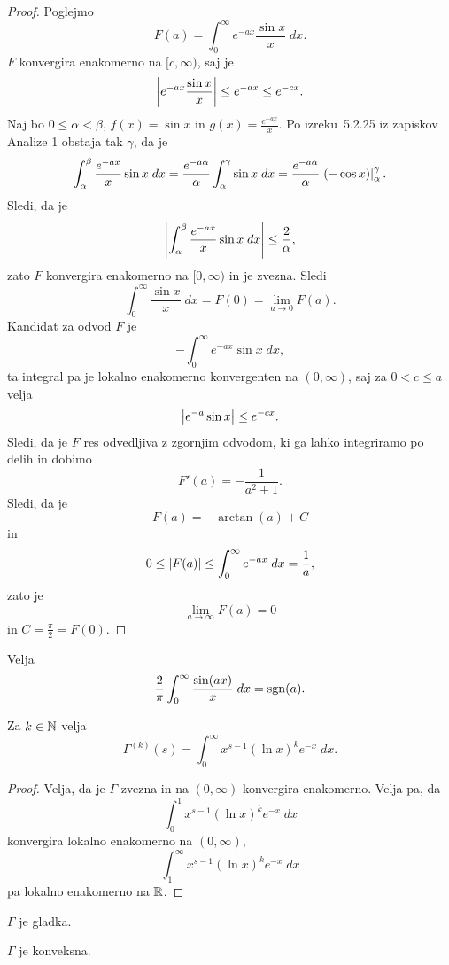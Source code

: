 \begin{proof}
Poglejmo
\[
F(a) = \int_0^\infty e^{-ax} \frac{\sin x}{x}\;dx.
\]
$F$ konvergira enakomerno na $[c,\infty)$, saj je
\[
\left\lvert e^{-ax} \frac{\sin x}{x}\right\rvert \leq e^{-ax} \leq e^{-cx}.
\]
Naj bo $0 \leq \alpha < \beta$, $f(x) = \sin x$ in
$g(x) = \frac{e^{-ax}}{x}$. Po izreku~5.2.25 iz zapiskov Analize 1
obstaja tak $\gamma$, da je
\[
\int_\alpha^\beta \frac{e^{-ax}}{x} \sin x\;dx =
\frac{e^{-a\alpha}}{\alpha} \int_\alpha^\gamma \sin x\;dx =
\frac{e^{-a\alpha}}{\alpha} \left. (-\cos x)\right|_{\alpha}^{\gamma}.
\]
Sledi, da je
\[
\left\lvert \int_\alpha^\beta \frac{e^{-ax}}{x} \sin x\;dx\right\rvert \leq
\frac{2}{\alpha},
\]
zato $F$ konvergira enakomerno na $[0,\infty)$ in je zvezna. Sledi
\[
\int_0^\infty \frac{\sin x}{x}\;dx = F(0) = \lim_{a \to 0} F(a).
\]
Kandidat za odvod $F$ je
\[
-\int_0^\infty e^{-ax} \sin x\;dx,
\]
ta integral pa je lokalno enakomerno konvergenten na $(0,\infty)$,
saj za $0 < c \leq a$ velja
\[
\left\lvert e^{-a} \sin x\right\rvert \leq e^{-cx}.
\]
Sledi, da je $F$ res odvedljiva z zgornjim odvodom, ki ga lahko
integriramo po delih in dobimo
\[
F'(a) = -\frac{1}{a^2 + 1}.
\]
Sledi, da je
\[
F(a) = -\arctan(a) + C
\]
in
\[
0 \leq \left\lvert F(a)\right\rvert \leq \int_0^\infty e^{-ax}\;dx = \frac{1}{a},
\]
zato je
\[
\lim_{a \to \infty} F(a) = 0
\]
in $C = \frac{\pi}{2} = F(0)$.
\end{proof}

\begin{posledica}
Velja
\[
\frac{2}{\pi} \int_0^\infty \frac{\sin (ax)}{x}\;dx = \operatorname{sgn}(a).
\]
\end{posledica}

\begin{trditev}
Za $k \in \mathbb{N}$ velja
\[
\Gamma^{(k)}(s) = \int_0^\infty x^{s-1} (\ln x)^k e^{-x}\;dx.
\]
\end{trditev}

\begin{proof}
Velja, da je $\Gamma$ zvezna in na $(0,\infty)$ konvergira
enakomerno. Velja pa, da
\[
\int_0^1 x^{s-1} (\ln x)^k e^{-x}\;dx
\]
konvergira lokalno enakomerno na $(0,\infty)$,
\[
\int_1^\infty x^{s-1} (\ln x)^k e^{-x}\;dx
\]
pa lokalno enakomerno na $\mathbb{R}$.
\end{proof}

\begin{posledica}
$\Gamma$ je gladka.
\end{posledica}

\begin{posledica}
$\Gamma$ je konveksna.
\end{posledica}

